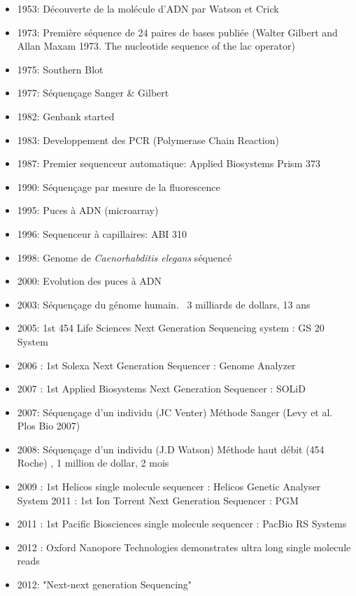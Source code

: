 \documentclass[a4paper,11pt,twoside]{report}
\begin{document}
\begin{itemize}
\item 1953: Découverte de la molécule d'ADN par Watson et Crick
\item 1973: Première séquence de 24 paires de bases publiée (Walter Gilbert and Allan Maxam 1973. The nucleotide sequence of the lac operator)
\item 1975: Southern Blot
\item 1977: Séquençage Sanger & Gilbert
\item 1982: Genbank started
\item 1983: Developpement des PCR (Polymerase Chain Reaction)
\item 1987: Premier sequenceur automatique: Applied Biosystems Prism 373
\item 1990: Séquençage par mesure de la fluorescence
\item 1995: Puces à ADN (microarray)
\item 1996: Sequenceur à capillaires: ABI 310
\item 1998: Genome de \textit{Caenorhabditis elegans} séquencé
\item 2000: Evolution des puces à ADN
\item 2003: Séquençage du génome humain. ~3 milliards de dollars, 13 ans 
\item 2005: 1st 454 Life Sciences Next Generation Sequencing system : GS 20 System
\item 2006 : 1st Solexa Next Generation Sequencer : Genome Analyzer
\item 2007 : 1st Applied Biosystems Next Generation Sequencer : SOLiD
\item 2007: Séquençage d'un individu (JC Venter) Méthode Sanger (Levy et al. Plos Bio 2007)
\item 2008: Séquençage d'un individu (J.D Watson) Méthode haut débit (454 Roche) \citep{wheeler2008complete}, 1 million de dollar, 2 mois
\item 2009 : 1st Helicos single molecule sequencer : Helicos Genetic Analyser System 2011 : 1st Ion Torrent Next Generation Sequencer : PGM
\item 2011 : 1st Pacific Biosciences single molecule sequencer : PacBio RS Systems
\item 2012 : Oxford Nanopore Technologies demonstrates ultra long single molecule reads
\item 2012: "Next-next generation Sequencing"
\end{itemize}
\end{document}
